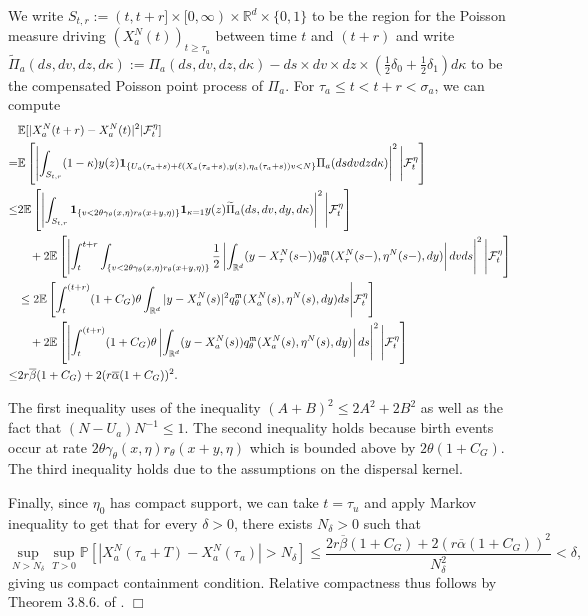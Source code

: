 \documentclass[12pt]{article}
\newenvironment {proof}{{\noindent\bf Proof }}{\hfill $\Box$ \medskip}
\def \tilde{\widetilde}
\newcommand{\ind}{\mathbf{1}}
\begin{document}
\begin{proof}
We write $S_{t,r}:=(t,t+r  ]\times [0,\infty )\times \mathbb{R}^d\times 
\{0,1\}$ to be the region for the Poisson measure driving $(X^{N}_{a}(t))_{t \geq \tau_a}$ between time $t$ and $(t+r)$ and write $\tilde\Pi_{a}(ds,dv,dz,d\kappa):=\Pi_{a}(ds,dv,dz, d\kappa) - ds\times dv\times dz \times (\frac{1}{2}\delta_{0}+\frac{1}{2}\delta_{1})d\kappa$ to be the compensated Poisson point process of $\Pi_{a}$. 
For $\tau_a \leq t < t+r < \sigma_a$, we can compute
\small
\begin{align*}
&\mathbb{E}[|X^{N}_{a}(t+r )-X^{N}_{a}(t)|^2|{\cal F}_t^{
\eta}]\\
=& \mathbb{E}\left[\left|
\int_{S_{t,r}}
(1-\kappa)y(z)
\ind_{ \{
        U_{a}(\tau_{a}+s)
        + \ell(X_{a}(\tau_{a}+s),y(z),\eta_{a}(\tau_{a}+s)) v < N
        \}
      } 
\Pi_{a}(dsdvdzd\kappa)
\right|^2
\Bigg|{\cal F}_t^{\eta}\right]\\
\leq&
 2\mathbb{E}\left[
 \left|
 \int_{S_{t,r}}
 {\bf 1}_{\{v < 2  \theta \gamma_{\theta}(x, \eta) r_{\theta}(x + y, \eta) \}}{\bf 1}_{\kappa =1}
y(z)
\tilde\Pi_{a}(ds,dv,dy,d\kappa )
\right|^2
\Bigg|{\cal F}_t^{\eta}
\right]\\
&\quad +2\mathbb{E}\left[
\left|
\int_{t}^{t+r}\int_{\{v < 2\theta \gamma_{\theta}(x, \eta) r_{\theta}(x + y, \eta) \}}
\frac{1}{2}\left| \int_{\mathbb{R}^d} (y-X^{N}_{\tau}(s-)) q^{\mathfrak{m}}_{\theta}(X^{N}_{\tau}(s-),\eta^{N}(s-),dy) 
\right|
dvds \right|^2
\Bigg|{\cal F}_t^{\eta}
\right]\\
&\leq 
2\mathbb{E}\left[
\int_{t}^{(t+r)   }
(1+C_G) \theta 
\int_{{\mathbb{R}}^d}|y-X^{N}_{
a}(s)|^2q^{\mathfrak{m}}_{\theta}(X^{N}_{a}(s),\eta^{N}(s),dy)ds
\Bigg|{\cal F}_t^{\eta}\right]\\
&\quad +2\mathbb{E}\left[
\left|
\int_{t}^{(t+r)}
(1+C_G)\theta 
\left|
\int_{{\mathbb{R}}^d}
(y-X^{N}_{a}(s))q^{\mathfrak{m}}_{\theta}(X^{N}_{a}(s),
\eta^{N}(s),dy)
\right|
ds
\right|^2
\Bigg|{\cal F}_t^{\eta}\right]\\
\leq& 2r \overline{\beta}(1+C_G)+2(r \overline{\alpha}(1+C_G))^2.
\end{align*}
\normalsize

The first inequality uses of the inequality $(A+B)^2 \leq 2A^2+2B^2$ as well as the fact that $(N-U_{a})N^{-1} \leq 1$.
The second inequality holds 
because birth events occur
at rate $2\theta \gamma_{\theta}(x, \eta) r_{\theta}(x + y, \eta)$
which is bounded above by $2\theta (1+C_G)$. The third inequality holds due to the assumptions on the dispersal kernel.

Finally, since $\eta_0$ has compact support, we can take $t=\tau_u$ and apply Markov inequality to get that for every $\delta>0$, there exists $N_{\delta}>0$ such that
\begin{equation}\label{eq: Compact Containment Condition for individual spatial motion}
\sup_{N>N_{\delta}}\sup_{T>0}\mathbb{P}\left[|X^{N}_{a}(\tau_{a}+T)-X^{N}_{a}(\tau_{a})|>N_{\delta}\right]\leq   \frac{2r \overline{\beta}(1+C_G)+2(r \overline{\alpha}(1+C_G))^2}{N_{\delta}^2}  < \delta,
\end{equation}
giving us compact containment condition. Relative compactness thus follows by Theorem 3.8.6.
of \cite{ethier/kurtz:1986}.
\end{proof}
\end{document}
